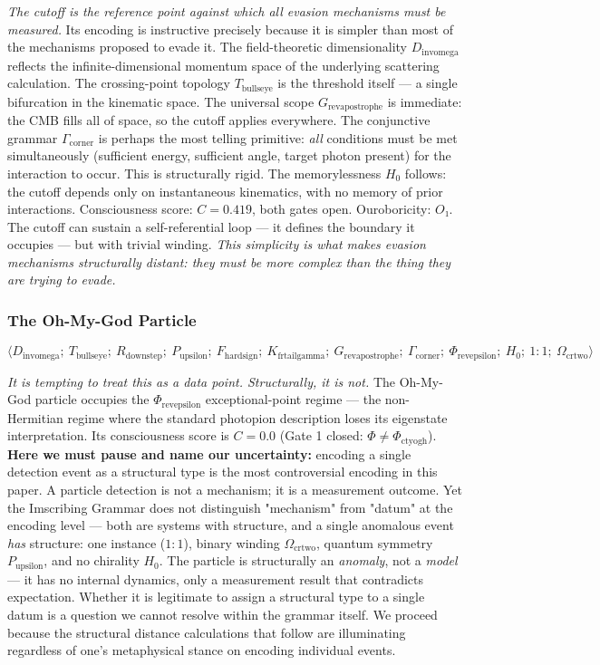 \documentclass[12pt,a4paper]{article}
\begin{document}
\emph{The cutoff is the reference point against which all evasion mechanisms must be measured.} Its encoding is instructive precisely because it is simpler than most of the mechanisms proposed to evade it. The field-theoretic dimensionality $D_{\text{invomega}}$ reflects the infinite-dimensional momentum space of the underlying scattering calculation. The crossing-point topology $T_{\text{bullseye}}$ is the threshold itself --- a single bifurcation in the kinematic space. The universal scope $G_{\text{revapostrophe}}$ is immediate: the CMB fills all of space, so the cutoff applies everywhere. The conjunctive grammar $\Gamma_{\text{corner}}$ is perhaps the most telling primitive: \emph{all} conditions must be met simultaneously (sufficient energy, sufficient angle, target photon present) for the interaction to occur. This is structurally rigid. The memorylessness $H_0$ follows: the cutoff depends only on instantaneous kinematics, with no memory of prior interactions. Consciousness score: $C = 0.419$, both gates open. Ouroboricity: $O₁$. The cutoff can sustain a self-referential loop --- it defines the boundary it occupies --- but with trivial winding. \emph{This simplicity is what makes evasion mechanisms structurally distant: they must be more complex than the thing they are trying to evade.}

\subsubsection{The Oh-My-God Particle}

\[\langle D_{\text{invomega}};\ T_{\text{bullseye}};\ R_{\text{downstep}};\ P_{\text{upsilon}};\ F_{\text{hardsign}};\ K_{\text{frtailgamma}};\ G_{\text{revapostrophe}};\ \Gamma_{\text{corner}};\ \Phi_{\text{revepsilon}};\ H_0;\ 1{:}1;\ \Omega_{\text{crtwo}} \rangle\]

\emph{It is tempting to treat this as a data point. Structurally, it is not.} The Oh-My-God particle occupies the $\Phi_{\text{revepsilon}}$ exceptional-point regime --- the non-Hermitian regime where the standard photopion description loses its eigenstate interpretation. Its consciousness score is $C = 0.0$ (Gate 1 closed: $\Phi \neq \Phi_{\text{ctyogh}}$). \textbf{Here we must pause and name our uncertainty:} encoding a single detection event as a structural type is the most controversial encoding in this paper. A particle detection is not a mechanism; it is a measurement outcome. Yet the Imscribing Grammar does not distinguish "mechanism" from "datum" at the encoding level --- both are systems with structure, and a single anomalous event \emph{has} structure: one instance ($1{:}1$), binary winding $\Omega_{\text{crtwo}}$, quantum symmetry $P_{\text{upsilon}}$, and no chirality $H_0$. The particle is structurally an \emph{anomaly}, not a \emph{model} --- it has no internal dynamics, only a measurement result that contradicts expectation. Whether it is legitimate to assign a structural type to a single datum is a question we cannot resolve within the grammar itself. We proceed because the structural distance calculations that follow are illuminating regardless of one's metaphysical stance on encoding individual events.
\end{document}
